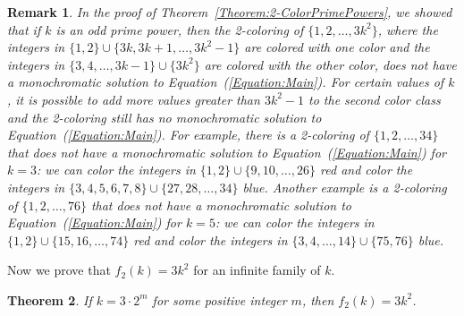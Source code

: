 \documentclass[10pt,a4paper]{amsart}
\newtheorem{theorem}{Theorem}[section]
\newtheorem{remark}[theorem]{Remark}
\begin{document}
\begin{remark}
In the proof of Theorem~\ref{Theorem:2-ColorPrimePowers}, we showed that if $k$ is an odd prime power, then the 2-coloring of $\{1,2,\ldots,3k^2\}$, where the integers in $\{1,2\}\cup\{3k,3k+1,\ldots,3k^2-1\}$ are colored with one color and the integers in $\{3,4,\ldots,3k-1\}\cup\{3k^2\}$ are colored with the other color, does not have a monochromatic solution to Equation~(\ref{Equation:Main}). For certain values of $k$, it is possible to add more values greater than $3k^2-1$ to the second color class and the 2-coloring still has no monochromatic solution to Equation~(\ref{Equation:Main}). For example, there is a 2-coloring of $\{1,2,\ldots,34\}$ that does not have a monochromatic solution to Equation~(\ref{Equation:Main}) for $k=3$: we can color the integers in $\{1,2\}\cup\{9,10,\ldots,26\}$ red and color the integers in $\{3,4,5,6,7,8\}\cup\{27,28,\ldots,34\}$ blue. Another example is a 2-coloring of $\{1,2,\ldots,76\}$ that does not have a monochromatic solution to Equation~(\ref{Equation:Main}) for $k=5$: we can color the integers in $\{1,2\}\cup\{15,16,\ldots,74\}$ red and color the integers in $\{3,4,\ldots,14\}\cup\{75,76\}$ blue.
\end{remark}


Now we prove that $f_2(k)=3k^2$ for an infinite family of $k$.

\begin{theorem}
    If $k=3\cdot2^m$ for some positive integer $m$, then $f_2(k)=3k^2$.
\end{theorem}
\end{document}
